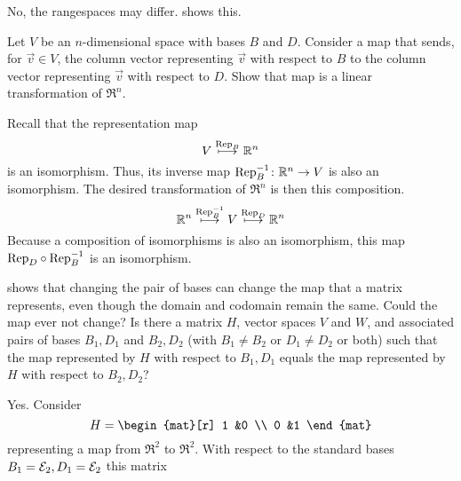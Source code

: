 \begin{exercises}
\begin{answer}
      No, the rangespaces may differ.
       shows this.
    \end{answer}
  \recommended \item 
    Let \( V \) be an \( n \)-dimensional space with bases \( B \) and
    \( D \).
    Consider a map that sends, for \( \vec{v}\in V\), 
    the column vector representing \( \vec{v} \) with
    respect to \( B \) to the column vector representing \( \vec{v} \) with
    respect to \( D \).
    Show that map is a linear transformation of \( \Re^n \).
    \begin{answer}
      Recall that the representation map
      \begin{equation*}
        V\stackrel{\text{Rep}_{B}}{\longmapsto}\mathbb{R}^n
      \end{equation*}
      is an isomorphism.
      Thus, its inverse map $\mbox{$\mbox{Rep}_B^{-1}\colon \mathbb{R}^n\to V$}$
      is also an isomorphism.
      The desired transformation of $\Re^n$ is then this composition.
      \begin{equation*}
        \mathbb{R}^n\stackrel{\text{Rep}_{B}^{-1}}{\longmapsto}
        V\stackrel{\text{Rep}_{D}}{\longmapsto}\mathbb{R}^n
      \end{equation*}
      Because a composition of isomorphisms is also an isomorphism, 
      this map $\mbox{Rep}_{D}\mathbin\circ \mbox{Rep}_{B}^{-1}$
      is an isomorphism.
    \end{answer}
  \item 
     shows that changing the pair of
    bases can change the map that a matrix
    represents, even though the domain and codomain remain the same.
    Could the map ever not change?
    Is there a matrix \( H \), vector spaces \( V \) and \( W \), and
    associated pairs of bases \( B_1,D_1 \) and \( B_2,D_2 \) (with
    \( B_1\neq B_2 \) or \( D_1\neq D_2 \) or both) 
    such that the map represented
    by \( H \) with respect to \( B_1,D_1 \) equals the map represented
    by \( H \) with respect to \( B_2,D_2 \)?
    \begin{answer}
      Yes.
      Consider
      \begin{equation*}
        H=\begin{mat}[r]
            1  &0  \\
            0  &1
          \end{mat}
      \end{equation*}
      representing a map from \( \Re^2 \) to \( \Re^2 \).
      With respect to the standard bases 
      \( B_1={\cal E}_2, D_1={\cal E}_2 \) this matrix

\end{answer}
\end{exercises}
